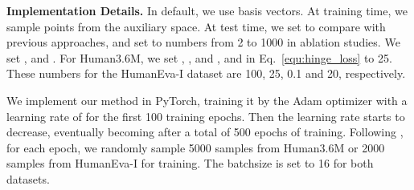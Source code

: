 \documentclass[sigconf,screen,nonacm]{acmart}
\begin{document}
	
	\textbf{Implementation Details.} 
In default, we use  basis vectors. At training time, we sample  points from the auxiliary space. At test time, we set  to compare with previous approaches, and set  to numbers from 2 to 1000 in ablation studies. We set , and . For Human3.6M, we set , , and , and  in Eq.~\ref{equ:hinge_loss} to 25. These numbers for the HumanEva-I dataset are 100, 25, 0.1 and 20, respectively. 
	
	We implement our method in PyTorch, training it by the Adam optimizer with a learning rate of  for the first 100 training epochs. Then the learning rate starts to decrease, eventually becoming  after a total of 500 epochs of training. Following \cite{yuan2020dlow,mao2021generating}, for each epoch, we randomly sample 5000 samples from Human3.6M or 2000 samples from HumanEva-I for training. The batchsize is set to 16 for both datasets.
	
\end{document}

